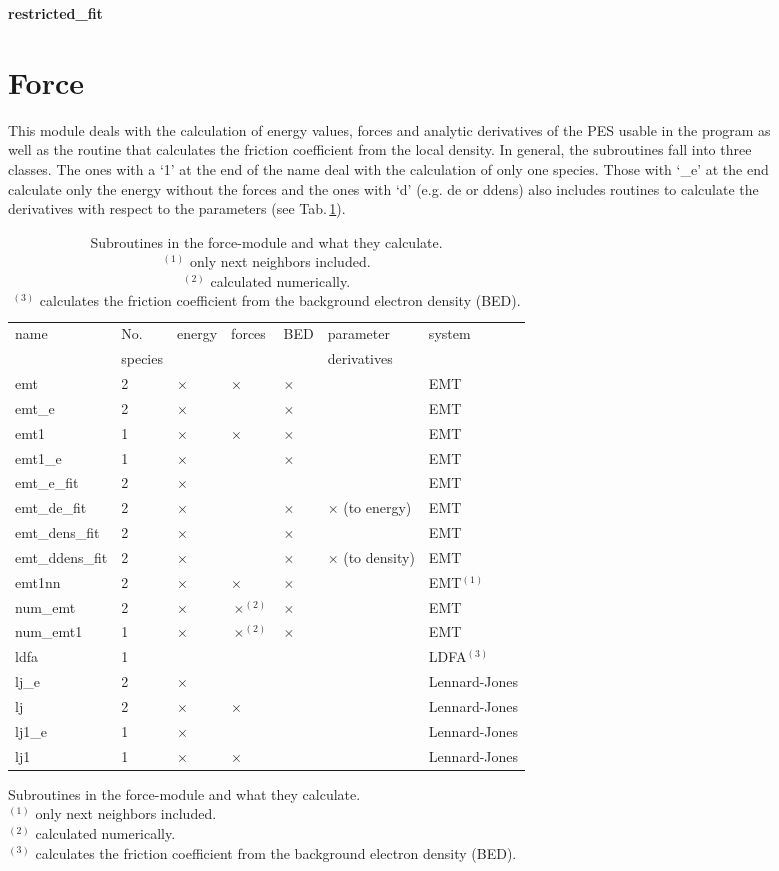 \documentclass[twoside, 11pt, titlepage, captions=nooneline, a4paper, headsepline]{scrbook}%
\newcommand{\9}{\mathrm}
\newcommand{\0}{\,\mathrm}
\begin{document}
\begin{figure}[b!]
\textbf{restricted\_fit}\\

\section{Force}
This module deals with the calculation of energy values, forces and analytic derivatives of the PES usable in the program as well as the routine that calculates the friction coefficient from the local density. In general, the subroutines fall into three classes. The ones with a `1' at the end of the name deal with the calculation of only one species. Those with `\_e' at the end calculate only the energy without the forces and the ones with `d' (e.g. de or ddens) also includes routines to calculate the derivatives with respect to the parameters (see Tab.\,\ref{Tab:Funct:force}).

\begin{table}[b!]
\centering
\caption{Subroutines in the force-module and what they calculate.\\
$^{(1)}$ only next neighbors included.\\
$^{(2)}$ calculated numerically.\\
$^{(3)}$ calculates the friction coefficient from the background electron density (BED).}
\label{Tab:Funct:force}
\begin{tabular}{lllllll}
\hline\hline
name			&No.	& energy	&forces			&BED		&parameter	& system\\
&species&&&&derivatives&\\
\hline
emt				&2				&$\times$	&$\times$		&$\times$	&						&EMT\\
emt\_e 			&2 				&$\times$	&				&$\times$	&						&EMT\\
emt1			&1				&$\times$	&$\times$		&$\times$	&						&EMT\\
emt1\_e 		&1				&$\times$	&				&$\times$	&						&EMT\\
emt\_e\_fit 	&2 				&$\times$	&				&			&						&EMT\\
emt\_de\_fit 	&2				&$\times$	&				&$\times$	&$\times$ (to energy)	&EMT\\
emt\_dens\_fit	&2				&$\times$	&				&$\times$	&						&EMT\\
emt\_ddens\_fit	&2				&$\times$	&				&$\times$	&$\times$ (to density)	&EMT\\
emt1nn			&2				&$\times$	&$\times$		&$\times$	&						&EMT$^{(1)}$\\
num\_emt		&2				&$\times$	&$\times^{(2)}$	&$\times$	&						&EMT\\
num\_emt1		&1				&$\times$	&$\times^{(2)}$	&$\times$	&						&EMT\\
ldfa			&1				&			&				&			&						&LDFA$^{(3)}$\\
lj\_e			&2				&$\times$	&				&			&						&Lennard-Jones\\
lj				&2				&$\times$	&$\times$		&			&						&Lennard-Jones\\
lj1\_e			&1				&$\times$	&				&			&						&Lennard-Jones\\
lj1				&1				&$\times$	&$\times$		&			&						&Lennard-Jones\\


\end{tabular}
\end{table}
\end{figure}
\end{document}
